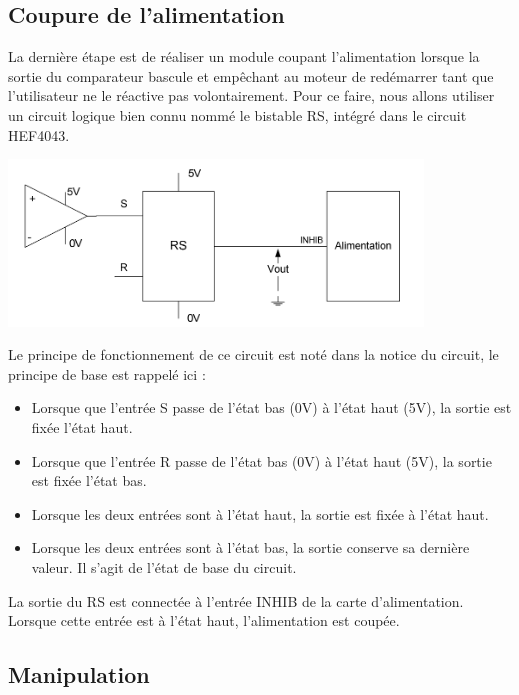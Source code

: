 \documentclass{../template/labo}
\begin{document}
\subsection{Coupure de l'alimentation}

La dernière étape est de réaliser un module coupant l'alimentation lorsque la sortie du comparateur
bascule et empêchant au moteur de redémarrer tant que l'utilisateur ne le réactive pas volontairement.
Pour ce faire, nous allons utiliser un circuit logique bien connu nommé le bistable RS, intégré dans le
circuit HEF4043.

\begin{center}
\includegraphics[width=11cm]{sch9}
\end{center}

Le principe de fonctionnement de ce circuit est noté dans la notice du circuit, le principe de base est
rappelé ici :

\begin{itemize}
    \item Lorsque que l'entrée S passe de l'état bas (0V) à l'état haut (5V), la sortie est fixée l'état haut.
    \item Lorsque que l'entrée R passe de l'état bas (0V) à l'état haut (5V), la sortie est fixée l'état bas.
    \item Lorsque les deux entrées sont à l'état haut, la sortie est fixée à l'état haut.
    \item Lorsque les deux entrées sont à l'état bas, la sortie conserve sa dernière valeur. Il s'agit de l'état de base du circuit.
\end{itemize}

La sortie du RS est connectée à l'entrée INHIB de la carte d'alimentation. Lorsque cette entrée est à
l'état haut, l'alimentation est coupée.

\subsection{Manipulation}

\end{document}
